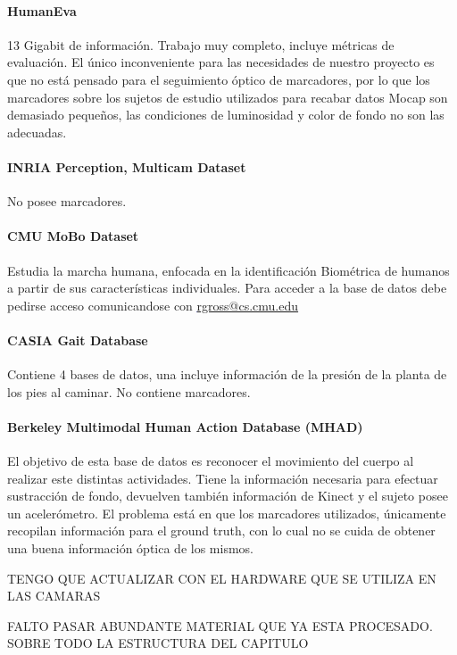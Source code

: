 \paragraph{HumanEva}
13 Gigabit de información. Trabajo muy completo, incluye métricas de evaluación. El único inconveniente para las necesidades de nuestro proyecto es que no está pensado para el seguimiento óptico de marcadores, por lo que los marcadores sobre los sujetos de estudio utilizados para recabar datos Mocap son demasiado pequeños, las condiciones de luminosidad y color de fondo no son las adecuadas.

\paragraph{INRIA Perception, Multicam Dataset}
No posee marcadores. 

\paragraph{CMU MoBo Dataset}
Estudia la marcha humana, enfocada en la identificación Biométrica de humanos a partir de sus características individuales. Para acceder a la base de datos debe pedirse acceso comunicandose con \textcolor{blue}{\underline{\url{rgross@cs.cmu.edu }}}

\paragraph{CASIA Gait Database} 
Contiene 4 bases de datos, una incluye información de la presión de la planta de los pies al caminar. No contiene marcadores.

\paragraph{Berkeley Multimodal Human Action Database (MHAD)}
El objetivo de esta base de datos es reconocer el movimiento del cuerpo al realizar este distintas actividades. Tiene la información necesaria para efectuar sustracción de fondo, devuelven también información de Kinect y el sujeto posee un acelerómetro. El problema está en que los marcadores utilizados, únicamente recopilan información para el ground truth, con lo cual no se cuida de obtener una buena información óptica de los mismos.




TENGO QUE ACTUALIZAR CON EL HARDWARE QUE SE UTILIZA EN LAS CAMARAS


FALTO PASAR ABUNDANTE MATERIAL QUE YA ESTA PROCESADO. SOBRE TODO LA ESTRUCTURA DEL CAPITULO 
